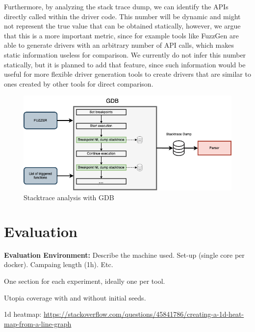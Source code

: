 \documentclass[a4paper,11pt,oneside]{report}
\begin{document}
Furthermore, by analyzing the stack trace dump, we can identify the 
APIs directly called within the driver code. 
This number will be dynamic and might not
represent the true value that can be obtained statically, however, we
argue that this is a more important metric, since for example tools
like FuzzGen are able to generate drivers with an arbitrary number of 
API calls, which makes static information useless for comparison. 
We currently do not infer this number statically, but it is planned 
to add that feature, since such information would be useful for
more flexible driver generation tools to create drivers that are 
similar to ones created by other tools for direct comparison. 


\begin{figure}[htb]
	\centering
	\includegraphics[width=16cm]{figures/stacktrace.png}
	\caption{Stacktrace analysis with GDB}
	\label{fig:stacktrace}
\end{figure}





\chapter{Evaluation}

\textbf{Evaluation Environment:} Describe the machine used. Set-up (single core per docker). Campaing length (1h). Etc.


One section for each experiment, ideally one per tool.


Utopia coverage with and without initial seeds.


1d heatmap: \url{https://stackoverflow.com/questions/45841786/creating-a-1d-heat-map-from-a-line-graph}
\end{document}
